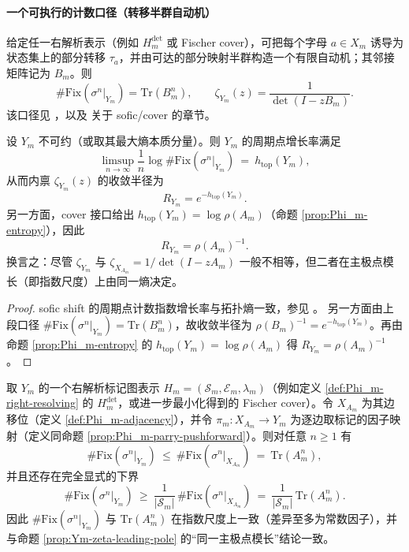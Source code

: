 \paragraph{一个可执行的计数口径（转移半群自动机）}
给定任一右解析表示（例如 $H_m^{\mathrm{det}}$ 或 Fischer cover），可把每个字母 $a\in X_m$ 诱导为状态集上的部分转移 $\tau_a$，并由可达的部分映射半群构造一个有限自动机；其邻接矩阵记为 $B_m$。则
\[
\#\mathrm{Fix}(\sigma^n|_{Y_m})=\mathrm{Tr}(B_m^n),\qquad
\zeta_{Y_m}(z)=\frac{1}{\det(I-zB_m)}.
\]
该口径见 \cite{Nasu1995TextileSystems}，以及 \cite{LindMarcus1995,Kitchens1998SymbolicDynamics} 关于 sofic/cover 的章节。

\begin{proposition}\label{prop:Ym-zeta-leading-pole}
设 \(Y_m\) 不可约（或取其最大熵本质分量）。则 \(Y_m\) 的周期点增长率满足
\[
\limsup_{n\to\infty}\frac{1}{n}\log\#\mathrm{Fix}(\sigma^n|_{Y_m})
\ =\ h_{\mathrm{top}}(Y_m),
\]
从而内禀 \(\zeta_{Y_m}(z)\) 的收敛半径为
\[
R_{Y_m}=e^{-h_{\mathrm{top}}(Y_m)}.
\]
另一方面，cover 接口给出 \(h_{\mathrm{top}}(Y_m)=\log\rho(A_m)\)（命题 \ref{prop:Phi_m-entropy}），因此
\[
R_{Y_m}=\rho(A_m)^{-1}.
\]
换言之：尽管 \(\zeta_{Y_m}\) 与 \(\zeta_{X_{A_m}}=1/\det(I-zA_m)\) 一般不相等，但二者在主极点模长（即指数尺度）上由同一熵决定。
\end{proposition}

\begin{proof}
sofic shift 的周期点计数指数增长率与拓扑熵一致，参见 \cite{Weiss1973SFTandSofic,CovenPaul1975SoficSystems,LindMarcus1995,Kitchens1998SymbolicDynamics}。
另一方面由上段口径 \(\#\mathrm{Fix}(\sigma^n|_{Y_m})=\mathrm{Tr}(B_m^n)\)，故收敛半径为 \(\rho(B_m)^{-1}=e^{-h_{\mathrm{top}}(Y_m)}\)。再由命题 \ref{prop:Phi_m-entropy} 的 \(h_{\mathrm{top}}(Y_m)=\log\rho(A_m)\) 得 \(R_{Y_m}=\rho(A_m)^{-1}\)。
\end{proof}

\begin{proposition}[周期点计数的显式夹逼：cover \texorpdfstring{$\Rightarrow$}{=>} sofic]\label{prop:periodic-count-sandwich}
取 \(Y_m\) 的一个右解析标记图表示 \(H_m=(\mathcal{S}_m,\mathcal{E}_m,\lambda_m)\)（例如定义 \ref{def:Phi_m-right-resolving} 的 \(H_m^{\mathrm{det}}\)，或进一步最小化得到的 Fischer cover）。令 \(X_{A_m}\) 为其边移位（定义 \ref{def:Phi_m-adjacency}），并令 \(\pi_m:X_{A_m}\to Y_m\) 为逐边取标记的因子映射（定义同命题 \ref{prop:Phi_m-parry-pushforward}）。则对任意 \(n\ge 1\) 有
\[
\#\mathrm{Fix}(\sigma^n|_{Y_m})
\ \le\
\#\mathrm{Fix}(\sigma^n|_{X_{A_m}})
\ =\
\mathrm{Tr}(A_m^n),
\]
并且还存在完全显式的下界
\[
\#\mathrm{Fix}(\sigma^n|_{Y_m})
\ \ge\
\frac{1}{|\mathcal{S}_m|}\,\#\mathrm{Fix}(\sigma^n|_{X_{A_m}})
\ =\
\frac{1}{|\mathcal{S}_m|}\,\mathrm{Tr}(A_m^n).
\]
因此 \(\#\mathrm{Fix}(\sigma^n|_{Y_m})\) 与 \(\mathrm{Tr}(A_m^n)\) 在指数尺度上一致（差异至多为常数因子），并与命题 \ref{prop:Ym-zeta-leading-pole} 的“同一主极点模长”结论一致。
\end{proposition}

